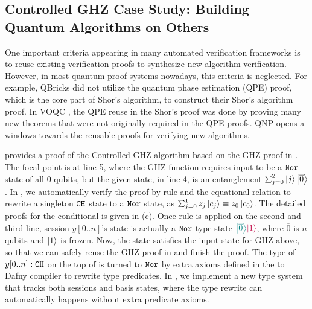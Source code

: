 \subsection{Controlled GHZ Case Study: Building Quantum Algorithms on Others}

One important criteria appearing in many automated verification frameworks is to reuse existing verification proofs to synthesize new algorithm verification. 
However, in most quantum proof systems nowadays, this criteria is neglected. For example, QBricks did not utilize the quantum phase estimation (QPE) proof, which is the core part of Shor's algorithm, to construct their Shor's algorithm proof.
In VOQC \cite{VOQC}, the QPE reuse in the Shor's proof was done by proving many new theorems that were not originally required in the QPE proofs. QNP opens a windows towards the reusable proofs for verifying new algorithms.

 provides a proof of the Controlled GHZ algorithm based on the GHZ proof in . The focal point is at  line 5, where the GHZ function requires input to be a $\texttt{Nor}$ state of all $0$ qubits, but the given state, in line 4, is an entanglement $\scha{2}{}{j}{\ket{\overline{0}}}$. In \qafny, we automatically verify the proof by rule  and the equational relation to rewrite a singleton $\texttt{CH}$ state to a $\texttt{Nor}$ state, as $\sch{1}{z_j}{c_j}\equiv z_0\ket{c_0}$. The detailed proofs for the conditional is given in (c). Once rule  is applied on the second and third line, session $y[0..n]$'s state is actually a $\texttt{Nor}$ type state $\textcolor{teal}{\left\vert{\overline{0}}\right\rangle}\textcolor{purple}{\left\vert{1}\right\rangle}$, where $\overline{0}$ is $n$ qubits and $\left\vert{1}\right\rangle$ is frozen. Now, the state satisfies the input state for GHZ above,
so that we can safely reuse the GHZ proof in  and finish the proof. 
The type of $y[0..n]:\texttt{CH}$ on the top of  is turned to $\texttt{Nor}$ by extra axioms defined in the \qafny to Dafny compiler to rewrite type predicates.
In , we implement a new type system that tracks both sessions and basis states, where the type rewrite can automatically happens without extra predicate axioms.

